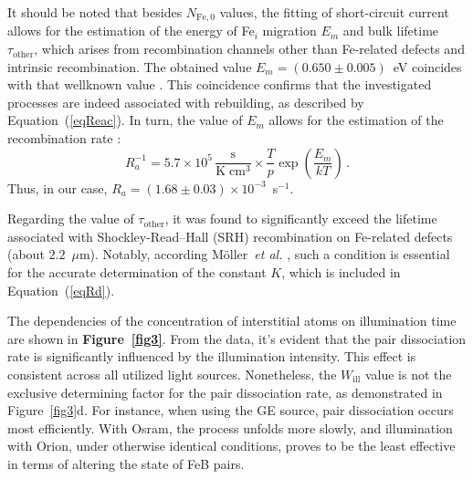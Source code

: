 \documentclass{WileyMSP-template}
\begin{document}
It should be noted that besides $N_\mathrm{Fe,0}$ values,
the fitting of short-circuit current \cite{Olikh2022:JMatSci,Olikh2021JAP} allows for the estimation of the energy of Fe$_i$ migration $E_m$
and bulk lifetime $\tau_\mathrm{other}$, which arises from recombination channels other than Fe-related defects and intrinsic recombination.
The obtained value $E_m=(0.650\pm0.005)$~eV coincides with that wellknown value \cite{FeBKin2019,FeBAssSST2011,FeBkinAPL2008}.
This coincidence confirms that the investigated processes are indeed associated with rebuilding,
as described by Equation~(\ref{eqReac}).
In turn, the value of $E_m$ allows for the estimation of the recombination rate \cite{FeBAssJAP2014,FeBKin2019,FeBAssSST2011}:
\begin{equation}
\label{eqTass}
R_a^{-1}=5.7\times10^5\,\frac{\mathrm{s}}{\mathrm{K}\;\mathrm{cm}^3}\times\frac{T}{p}\exp\left(\frac{E_m}{kT}\right)\,.
\end{equation}
Thus, in our case, $R_a=(1.68\pm0.03)\times10^{-3}$~s$^{-1}$.

Regarding the value of $\tau_\mathrm{other}$, it was found to significantly exceed the
lifetime associated with Shockley-Read–Hall (SRH) recombination on Fe-related defects (about $2.2$~$\mu$m).
Notably, according M\"{o}ller~\emph{et al.} \cite{FeBAssJAP2014},
such a condition is essential for the accurate determination of the constant $K$, which is included in Equation~(\ref{eqRd}).


The dependencies of the concentration of interstitial atoms on illumination time are shown in \textbf{Figure~\ref{fig3}}.
From the data, it's evident that the pair dissociation rate is significantly influenced by the illumination intensity.
This effect is consistent across all utilized light sources.
Nonetheless, the $W_\mathrm{ill}$ value is not the exclusive determining factor for the pair dissociation rate,
as demonstrated in Figure~\ref{fig3}d.
For instance, when using the GE source, pair dissociation occurs most efficiently.
With Osram, the process unfolds more slowly,
and illumination with Orion, under otherwise identical conditions, proves to be the least effective in terms of altering the state of FeB pairs.
\end{document}
